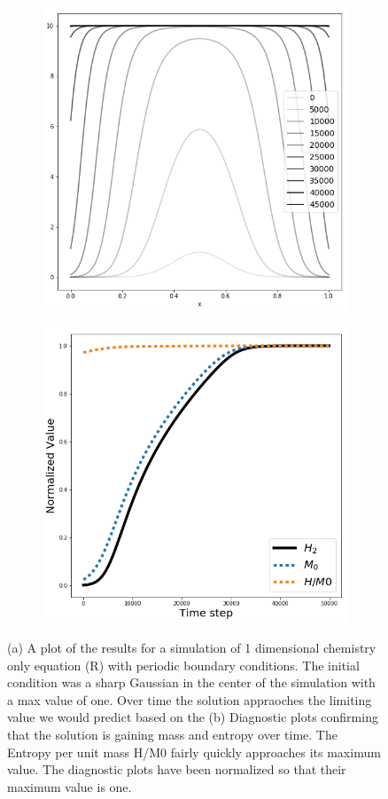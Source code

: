 \documentclass[]{article}
\begin{document}
\begin{figure}
	\begin{subfigure}{.5\textwidth}
		\centering
		\includegraphics[width=.8\linewidth]{figures/crank_nic_1D.png}
		\caption{}
	\end{subfigure}%
	\begin{subfigure}{.5\textwidth}
		\centering
		\includegraphics[width=.8\linewidth]{figures/crank_nic_diag.png}
		\caption{}
	\end{subfigure}
	\caption{(a) A plot of the results for a simulation of 1 dimensional chemistry only equation (R) with periodic boundary conditions. The initial condition was a sharp Gaussian in the center of the simulation with a max value of one. Over time the solution appraoches the limiting value we would predict based on the (b) Diagnostic plots confirming that the solution is  gaining mass and entropy over time. The Entropy per unit mass H/M0 fairly quickly approaches its maximum value. The diagnostic plots have been normalized so that their maximum value is one.}
	\label{fig:1D_crank_nic}
\end{figure}
\end{document}
